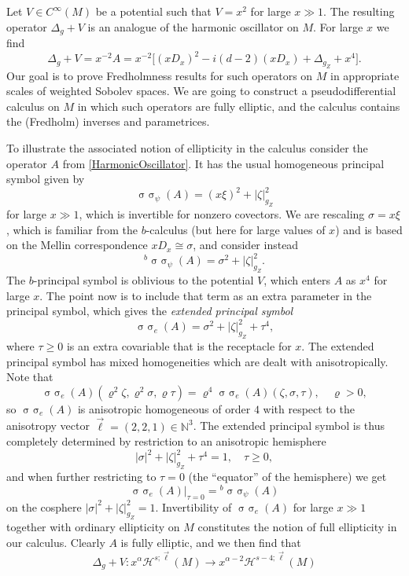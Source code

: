 \documentclass[reqno]{amsart}
\numberwithin{equation}{section}
\theoremstyle{definition}
\def\N{\mathbb N}
\DeclareMathOperator{\sym}{ \sigma\!\!\!\sigma}
\begin{document}
Let $V \in C^{\infty}(M)$ be a potential such that $V = x^2$ for large $x \gg 1$. The resulting operator $\Delta_g + V$ is an analogue of the harmonic oscillator on $M$. For large $x$ we find
\begin{equation}\label{HarmonicOscillator}
\Delta_g + V = x^{-2}A = x^{-2}\bigl[(xD_x)^2 - i(d-2)(xD_x) + \Delta_{g_Z} + x^4 \bigr].
\end{equation}
Our goal is to prove Fredholmness results for such operators on $M$ in appropriate scales of weighted Sobolev spaces. We are going to construct a pseudodifferential calculus on $M$ in which such operators are fully elliptic, and the calculus contains the (Fredholm) inverses and parametrices.

To illustrate the associated notion of ellipticity in the calculus consider the operator $A$ from \eqref{HarmonicOscillator}. It has the usual homogeneous principal symbol given by
$$
\sym_{\psi}(A) = (x \xi)^2 + |\zeta|_{g_Z}^2
$$
for large $x \gg 1$, which is invertible for nonzero covectors. We are rescaling $\sigma = x\xi$, which is familiar from the $b$-calculus (but here for large values of $x$) and is based on the Mellin correspondence $xD_x \cong \sigma$, and consider instead
$$
{}^b\sym_{\psi}(A) = \sigma^2 + |\zeta|_{g_Z}^2.
$$
The $b$-principal symbol is oblivious to the potential $V$, which enters $A$ as $x^4$ for large $x$. The point now is to include that term as an extra parameter in the principal symbol, which gives the \emph{extended principal symbol}
$$
\sym_e(A) = \sigma^2 + |\zeta|_{g_Z}^2 + \tau^4,
$$
where $\tau \geq 0$ is an extra covariable that is the receptacle for $x$. The extended principal symbol has mixed homogeneities which are dealt with anisotropically. Note that
$$
\sym_e(A)(\varrho^2\zeta,\varrho^2\sigma,\varrho\tau) = \varrho^4\sym_e(A)(\zeta,\sigma,\tau), \quad \varrho > 0,
$$
so $\sym_e(A)$ is anisotropic homogeneous of order $4$ with respect to the aniso\-tropy vector $\vec{\ell} = (2,2,1) \in \N^3$. The extended principal symbol is thus completely determined by restriction to an anisotropic hemisphere
$$
|\sigma|^2 + |\zeta|_{g_Z}^2 + \tau^4 = 1, \quad \tau \geq 0,
$$
and when further restricting to $\tau = 0$ (the ``equator'' of the hemisphere) we get
$$
\sym_e(A)\big|_{\tau = 0} = {}^b\sym_{\psi}(A)
$$
on the cosphere $|\sigma|^2 + |\zeta|_{g_Z}^2 = 1$. Invertibility of $\sym_e(A)$ for large $x \gg 1$ together with ordinary ellipticity on $M$ constitutes the notion of full ellipticity in our calculus. Clearly $A$ is fully elliptic, and we then find that
\begin{equation}\label{DeltaV}
\Delta_g + V : x^{\alpha}{\mathscr H}^{s;\vec{\ell}}(M) \to x^{\alpha-2}{\mathscr H}^{s-4;\vec{\ell}}(M)
\end{equation}
\end{document}
